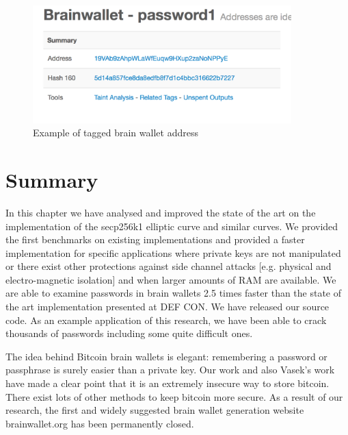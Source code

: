   \begin{figure}[h!]
  	\centering
  	\includegraphics[width=100mm]{./pics/tag_address.png}
  	\caption{Example of tagged brain wallet address }
  	\label{fig:tagged_address}
  \end{figure}
  
\section{Summary}
In this chapter we have analysed and improved the state of the art on the implementation of the secp256k1 elliptic curve and similar curves. We provided the first benchmarks on existing implementations and provided a faster implementation for specific applications where private keys are not manipulated or there exist other protections against side channel attacks [e.g. physical and electro-magnetic isolation] and when larger amounts of RAM are available. We are able to examine passwords in brain wallets 2.5 times faster than the state of the art implementation presented at DEF CON. We have released our source code. As an example application of this research, we have been able to crack thousands of passwords including some quite difficult ones.

The idea behind Bitcoin brain wallets is elegant: remembering a password or passphrase is surely easier than a private key. Our work and also Vasek's work \cite{vasek2016bitcoin} have made a clear point that it is an extremely insecure way to store bitcoin. There exist lots of other methods to keep bitcoin more secure. As a result of our research, the first and widely suggested brain wallet generation website brainwallet.org has been permanently closed.  
